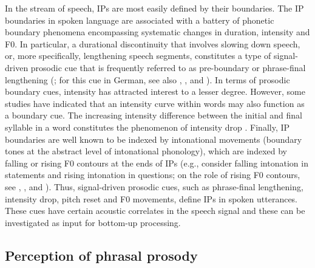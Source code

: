 \documentclass[output=paper]{langscibook}
\begin{document}
	\begin{sloppypar}
	In the stream of speech, IPs are most easily defined by their boundaries. The IP boundaries in spoken language are associated with a battery of phonetic boundary phenomena encompassing systematic changes in duration, intensity and F0. In particular, a durational discontinuity that involves slowing down speech, or, more specifically, lengthening speech segments, constitutes a type of signal-driven prosodic cue that is frequently referred to as pre-boundary or phrase-final lengthening (\citealt{berkovits1994, Fon2011, Nakai2009, petroneEtAl2017, Wightman1992}; for this cue in German, see also , , and ). %
	In terms of prosodic boundary cues, intensity has attracted interest to a lesser degree. However, some studies have indicated that an intensity curve within words may also function as a boundary cue. The increasing intensity difference between the initial and final syllable in a word constitutes the phenomenon of intensity drop \citep[][]{TrouvainEtAl1998, Wagner2019}. Finally, IP boundaries are well known to be indexed by intonational movements (boundary tones at the abstract level of intonational phonology), which are indexed by falling or rising F0 contours at the ends of IPs (e.g., consider falling intonation in statements and rising intonation in questions; on the role of rising F0 contours, see \cite{petroneEtAl2017},  , and ). 
	Thus, signal-driven prosodic cues, such as phrase-final lengthening, intensity drop, pitch reset and F0 movements, define IPs in spoken utterances. These cues have certain acoustic correlates in the speech signal and these can be investigated as input for bottom-up processing.
	\end{sloppypar}
	
	\subsection{Perception of phrasal prosody}
	
\end{document}
